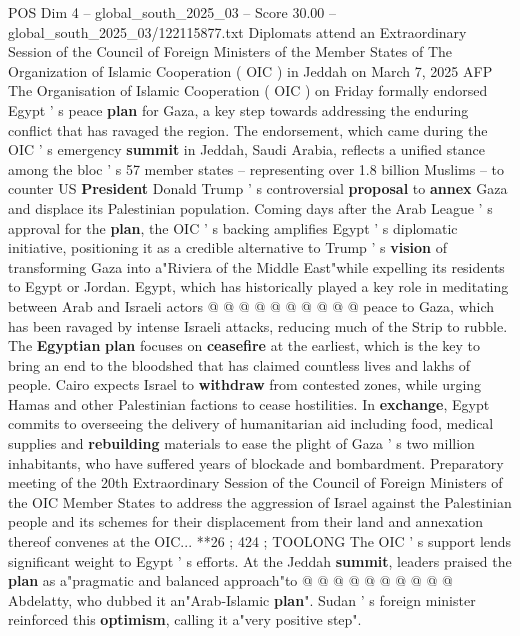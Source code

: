 \begin{textsample}{POS Dim 4 – global\_south\_2025\_03 – Score 30.00 – global\_south\_2025\_03/122115877.txt}  \label{ex:f4_pos_037}
Diplomats attend an Extraordinary Session of the Council of Foreign Ministers of the Member States of The Organization of Islamic Cooperation ( OIC ) in Jeddah on March 7, 2025 AFP The Organisation of Islamic Cooperation ( OIC ) on Friday formally endorsed Egypt ' s peace \textbf{plan} for Gaza, a key step towards addressing the enduring conflict that has ravaged the region.
The endorsement, which came during the OIC ' s emergency \textbf{summit} in Jeddah, Saudi Arabia, reflects a unified stance among the bloc ' s 57 member states -- representing over 1.8 billion Muslims -- to counter US \textbf{President} Donald Trump ' s controversial \textbf{proposal} to \textbf{annex} Gaza and displace its Palestinian population.
Coming days after the Arab League ' s approval for the \textbf{plan}, the OIC ' s backing amplifies Egypt ' s diplomatic initiative, positioning it as a credible alternative to Trump ' s \textbf{vision} of transforming Gaza into a"Riviera of the Middle East"while expelling its residents to Egypt or Jordan.
Egypt, which has historically played a key role in meditating between Arab and Israeli actors @ @ @ @ @ @ @ @ @ @ peace to Gaza, which has been ravaged by intense Israeli attacks, reducing much of the Strip to rubble.
The \textbf{Egyptian} \textbf{plan} focuses on \textbf{ceasefire} at the earliest, which is the key to bring an end to the bloodshed that has claimed countless lives and lakhs of people.
Cairo expects Israel to \textbf{withdraw} from contested zones, while urging Hamas and other Palestinian factions to cease hostilities.
In \textbf{exchange}, Egypt commits to overseeing the delivery of humanitarian aid including food, medical supplies and \textbf{rebuilding} materials to ease the plight of Gaza ' s two million inhabitants, who have suffered years of blockade and bombardment.
Preparatory meeting of the 20th Extraordinary Session of the Council of Foreign Ministers of the OIC Member States to address the aggression of Israel against the Palestinian people and its schemes for their displacement from their land and annexation thereof convenes at the OIC... **26 ; 424 ; TOOLONG The OIC ' s support lends significant weight to Egypt ' s efforts.
At the Jeddah \textbf{summit}, leaders praised the \textbf{plan} as a"pragmatic and balanced approach"to @ @ @ @ @ @ @ @ @ @ Abdelatty, who dubbed it an"Arab-Islamic \textbf{plan}".
Sudan ' s foreign minister reinforced this \textbf{optimism}, calling it a"very positive step".

\end{textsample}
